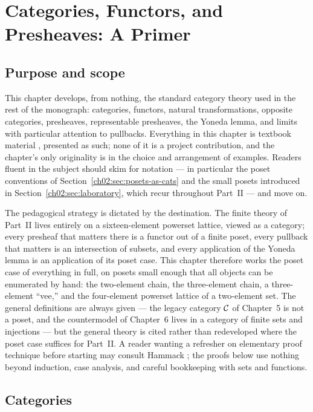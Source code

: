 \chapter{Categories, Functors, and Presheaves: A Primer}\label{ch02:chap}

\section{Purpose and scope}\label{ch02:sec:purpose}

This chapter develops, from nothing, the standard category theory used in
the rest of the monograph: categories, functors, natural transformations,
opposite categories, presheaves, representable presheaves, the Yoneda
lemma, and limits with particular attention to pullbacks. Everything in
this chapter is textbook material
\cite{awodey,riehl,maclanecwm,maclane}, presented as such; none of it is a
project contribution, and the chapter's only originality is in the choice
and arrangement of examples. Readers fluent in the subject should skim for
notation --- in particular the poset conventions of
Section~\ref{ch02:sec:posets-as-cats} and the small posets introduced in
Section~\ref{ch02:sec:laboratory}, which recur throughout Part~II --- and
move on.

The pedagogical strategy is dictated by the destination. The finite theory
of Part~II lives entirely on a sixteen-element powerset lattice, viewed as
a category; every presheaf that matters there is a functor out of a finite
poset, every pullback that matters is an intersection of subsets, and
every application of the Yoneda lemma is an application of its poset case.
This chapter therefore works the poset case of everything in full, on
posets small enough that all objects can be enumerated by hand: the
two-element chain, the three-element chain, a three-element ``vee,'' and
the four-element powerset lattice of a two-element set. The general
definitions are always given --- the legacy category $\mathcal{C}$ of Chapter~5 is
not a poset, and the countermodel of Chapter~6 lives in a category of
finite sets and injections --- but the general theory is cited rather than
redeveloped where the poset case suffices for Part~II. A reader wanting a
refresher on elementary proof technique before starting may consult
Hammack \cite{bookofproof}; the proofs below use nothing beyond induction,
case analysis, and careful bookkeeping with sets and functions.

\section{Categories}\label{ch02:sec:categories}

